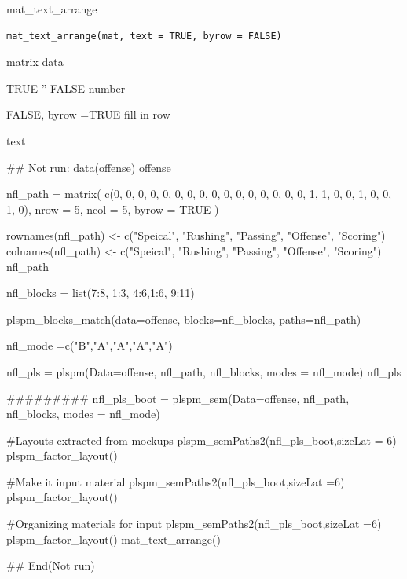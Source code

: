 \documentclass[a4paper]{book}
\begin{document}
%
\begin{Description}
mat\_text\_arrange
\end{Description}
%
\begin{Usage}
\begin{verbatim}
mat_text_arrange(mat, text = TRUE, byrow = FALSE)
\end{verbatim}
\end{Usage}
%
\begin{Arguments}
\begin{ldescription}
\item[\code{mat}] matrix data

\item[\code{text}] TRUE '' FALSE number

\item[\code{byrow}] FALSE, byrow =TRUE fill in row
\end{ldescription}
\end{Arguments}
%
\begin{Value}
text
\end{Value}
%
\begin{Examples}
\begin{ExampleCode}
\#\# Not run: 
data(offense)
offense %

nfl_path = matrix(
  c(0, 0, 0, 0, 0,
    0, 0, 0, 0, 0,
    0, 0, 0, 0, 0,
    0, 1, 1, 0, 0,
    1, 0, 0, 1, 0),
  nrow = 5, ncol = 5, byrow = TRUE )

rownames(nfl_path) <- c("Speical", "Rushing", "Passing", "Offense", "Scoring")
colnames(nfl_path) <- c("Speical", "Rushing", "Passing", "Offense", "Scoring")
nfl_path

nfl_blocks = list(7:8, 1:3, 4:6,1:6, 9:11)

plspm_blocks_match(data=offense, blocks=nfl_blocks,
                   paths=nfl_path)

nfl_mode =c("B","A","A","A","A")

nfl_pls = plspm(Data=offense, nfl_path, nfl_blocks, modes = nfl_mode)
nfl_pls%

#########
nfl_pls_boot = plspm_sem(Data=offense, nfl_path, nfl_blocks, modes = nfl_mode)

#Layouts extracted from mockups
plspm_semPaths2(nfl_pls_boot,sizeLat = 6)%
  plspm_factor_layout()

#Make it input material
plspm_semPaths2(nfl_pls_boot,sizeLat =6)%
  plspm_factor_layout() %

#Organizing materials for input
plspm_semPaths2(nfl_pls_boot,sizeLat =6)%
  plspm_factor_layout() %
  mat_text_arrange()

## End(Not run)

\end{ExampleCode}
\end{Examples}
\end{document}
